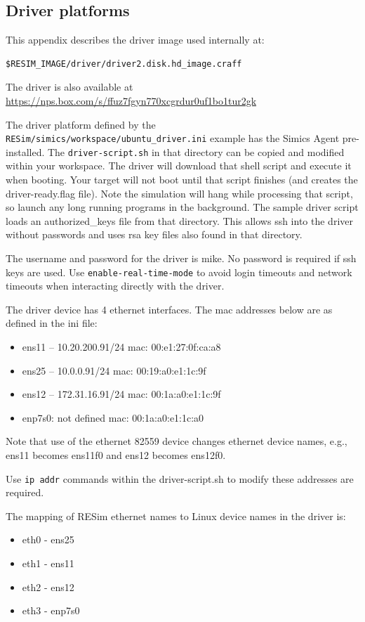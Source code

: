 \documentclass[titlepage]{article}
\begin{document}
\begin{appendices}
\section{Driver platforms}
\label{driver}
This appendix describes the driver image used internally at:
\begin{verbatim}
$RESIM_IMAGE/driver/driver2.disk.hd_image.craff
\end{verbatim}
The driver is also available at \url{https://nps.box.com/s/ffuz7fgyn770xcgrdur0uf1bo1tur2gk}

The driver platform defined by the {\tt RESim/simics/workspace/ubuntu\_driver.ini} example has the Simics Agent pre-installed.  The
{\tt driver-script.sh} in that directory can be copied and modified within your workspace.  The driver will download that shell script and execute
it when booting.  Your target will not boot until that script finishes (and creates the driver-ready.flag file).
Note the simulation will hang while processing that script, so launch any long running programs in the background.
The sample driver script loads an authorized\_keys file from that directory.  This allows ssh into the driver without passwords and uses
rsa key files also found in that directory.

The username and password for the driver is mike. No password is required if ssh keys are used.  Use {\tt enable-real-time-mode} to avoid login timeouts and network timeouts when
interacting directly with the driver.  

The driver device has 4 ethernet interfaces.  The mac addresses below are as defined in the ini file:
\begin{itemize}
\item ens11 -- 10.20.200.91/24  mac: 00:e1:27:0f:ca:a8
\item ens25 -- 10.0.0.91/24     mac: 00:19:a0:e1:1c:9f
\item ens12 -- 172.31.16.91/24  mac: 00:1a:a0:e1:1c:9f
\item enp7s0:  not defined      mac: 00:1a:a0:e1:1c:a0 
\end{itemize}
Note that use of the ethernet 82559 device changes ethernet device names, e.g., ens11 becomes ens11f0 and ens12 becomes ens12f0.

Use {\tt ip addr} commands within the driver-script.sh to modify these addresses are required.

The mapping of RESim ethernet names to Linux device names in the driver is: 

\begin{itemize}
\item eth0 - ens25
\item eth1 - ens11
\item eth2 - ens12
\item eth3 - enp7s0
\end{itemize}


\end{appendices}
\end{document}
